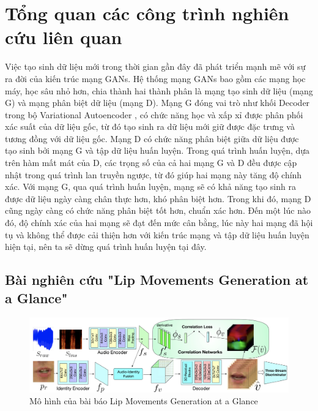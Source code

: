 \section{\texorpdfstring{Tổng quan các công trình nghiên cứu liên quan}{Content}}
Việc tạo sinh dữ liệu mới trong thời gian gần đây đã phát triển mạnh mẽ với sự ra đời của kiến trúc mạng GANs. Hệ thống mạng GANs bao gồm các mạng học máy, học sâu nhỏ hơn, chia thành hai thành phân là mạng tạo sinh dữ liệu (mạng G) và mạng phân biệt dữ liệu (mạng D). Mạng G đóng vai trò như khối Decoder trong bộ Variational Autoencoder \cite{vae_base},  có chức năng học và xấp xỉ được phân phối xác suất của dữ liệu gốc, từ đó tạo sinh ra dữ liệu mới giữ được đặc trưng và tương đồng với dữ liệu gốc. Mạng D có chức năng phân biệt giữa dữ liệu được tạo sinh bởi mạng G và tập dữ liệu huấn luyện. Trong quá trình huấn luyện, dựa trên hàm mất mát của D, các trọng số của cả hai mạng G và D đều được cập nhật trong quá trình lan truyền ngược, từ đó giúp hai mạng này tăng độ chính xác. Với mạng G, qua quá trình huấn luyện, mạng sẽ có khả năng tạo sinh ra được dữ liệu ngày càng chân thực hơn, khó phân biệt hơn. Trong khi đó, mạng D cũng ngày càng có chức năng phân biệt tốt hơn, chuẩn xác hơn. Đến một lúc nào đó, độ chính xác của hai mạng sẽ đạt đến mức cân bằng, lúc này hai mạng đã hội tụ và không thể được cải thiện hơn với kiến trúc mạng và tập dữ liệu huấn luyện hiện tại, nên ta sẽ dừng quá trình huấn luyện tại đây.


\subsection{\texorpdfstring{Bài nghiên cứu "Lip Movements Generation at a Glance"\cite{chen2018}}{Target}}

\begin{figure}[H]
    \centering
    \includegraphics[width=15cm]{./content/images/chen2018_model.png}
    \caption{Mô hình của bài báo Lip Movements Generation at a Glance}
    \label{fig:chen2018_model}
\end{figure}

